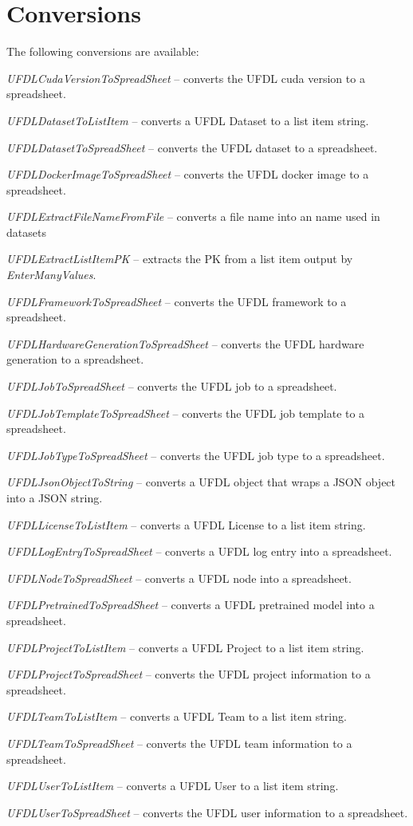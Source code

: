 \documentclass[a4paper]{book}
\begin{document}
\section{Conversions}
The following conversions are available:
\begin{tight_itemize}
  \item \textit{UFDLCudaVersionToSpreadSheet} -- converts the UFDL cuda version to a spreadsheet.
  \item \textit{UFDLDatasetToListItem} -- converts a UFDL Dataset to a list item string.
  \item \textit{UFDLDatasetToSpreadSheet} -- converts the UFDL dataset to a spreadsheet.
  \item \textit{UFDLDockerImageToSpreadSheet} -- converts the UFDL docker image to a spreadsheet.
  \item \textit{UFDLExtractFileNameFromFile} -- converts a file name into an name used in datasets
  \item \textit{UFDLExtractListItemPK} -- extracts the PK from a list item output by \textit{EnterManyValues}.
  \item \textit{UFDLFrameworkToSpreadSheet} -- converts the UFDL framework to a spreadsheet.
  \item \textit{UFDLHardwareGenerationToSpreadSheet} -- converts the UFDL hardware generation to a spreadsheet.
  \item \textit{UFDLJobToSpreadSheet} -- converts the UFDL job to a spreadsheet.
  \item \textit{UFDLJobTemplateToSpreadSheet} -- converts the UFDL job template to a spreadsheet.
  \item \textit{UFDLJobTypeToSpreadSheet} -- converts the UFDL job type to a spreadsheet.
  \item \textit{UFDLJsonObjectToString} -- converts a UFDL object that wraps a JSON object into a JSON string.
  \item \textit{UFDLLicenseToListItem} -- converts a UFDL License to a list item string.
  \item \textit{UFDLLogEntryToSpreadSheet} -- converts a UFDL log entry into a spreadsheet.
  \item \textit{UFDLNodeToSpreadSheet} -- converts a UFDL node into a spreadsheet.
  \item \textit{UFDLPretrainedToSpreadSheet} -- converts a UFDL pretrained model into a spreadsheet.
  \item \textit{UFDLProjectToListItem} -- converts a UFDL Project to a list item string.
  \item \textit{UFDLProjectToSpreadSheet} -- converts the UFDL project information to a spreadsheet.
  \item \textit{UFDLTeamToListItem} -- converts a UFDL Team to a list item string.
  \item \textit{UFDLTeamToSpreadSheet} -- converts the UFDL team information to a spreadsheet.
  \item \textit{UFDLUserToListItem} -- converts a UFDL User to a list item string.
  \item \textit{UFDLUserToSpreadSheet} -- converts the UFDL user information to a spreadsheet.
\end{tight_itemize}



\end{document}
